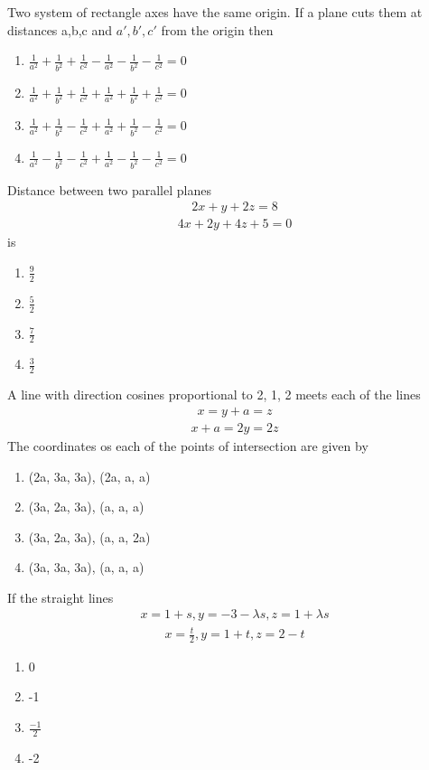 \item Two system of rectangle axes have the same origin. If a plane cuts them at distances a,b,c and $a',b',c'$ from the origin then
\begin{enumerate}
\item $\frac{1}{a^2} + \frac{1}{b^2} + \frac{1}{c^2} - \frac{1}{a^2} - \frac{1}{b^2} - \frac{1}{c^2} = 0$
\item $\frac{1}{a^2} + \frac{1}{b^2} + \frac{1}{c^2} + \frac{1}{a^2} + \frac{1}{b^2} + \frac{1}{c^2} = 0$
\item $\frac{1}{a^2} + \frac{1}{b^2} - \frac{1}{c^2} + \frac{1}{a^2} + \frac{1}{b^2} - \frac{1}{c^2} = 0$
\item $\frac{1}{a^2} - \frac{1}{b^2} - \frac{1}{c^2} + \frac{1}{a^2} - \frac{1}{b^2} - \frac{1}{c^2} = 0$
\end{enumerate}

\item Distance between two parallel planes 
\begin{align}
2x + y + 2z = 8
\end{align}
\begin{align}
4x + 2y + 4z + 5 = 0 
\end{align}
is
\begin{enumerate}
\item $\frac{9}{2}$
\item $\frac{5}{2}$
\item $\frac{7}{2}$
\item $\frac{3}{2}$
\end{enumerate}

\item A line with direction cosines proportional to 2, 1, 2 meets each of the lines 
\begin{align}
x = y + a = z
\end{align}
\begin{align}
x + a = 2y = 2z
\end{align}
The coordinates os each of the points of intersection are given by
\begin{enumerate}
\item (2a, 3a, 3a), (2a, a, a)
\item (3a, 2a, 3a), (a, a, a)
\item (3a, 2a, 3a), (a, a, 2a)
\item (3a, 3a, 3a), (a, a, a)
\end{enumerate}

\item If the straight lines
\begin{align}
x = 1 + s, y = -3 -\lambda s, z = 1 + \lambda s
\end{align}
\begin{align}
x = \frac{t}{2}, y = 1 + t, z = 2 - t
\end{align}
\begin{enumerate}
\item 0
\item -1
\item $\frac{-1}{2}$
\item -2
\end{enumerate}

